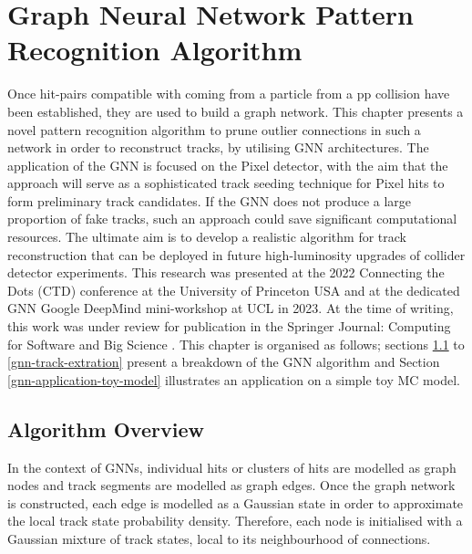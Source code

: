 
\chapter{Graph Neural Network Pattern Recognition Algorithm}\label{chapter-5}

Once hit-pairs compatible with coming from a particle from a pp collision have been established, they are used to build a graph network. This chapter presents a novel pattern recognition algorithm to prune outlier connections in such a network in order to reconstruct tracks, by utilising GNN architectures. The application of the GNN is focused on the Pixel detector, with the aim that the approach will serve as a sophisticated track seeding technique for Pixel hits to form preliminary track candidates. If the GNN does not produce a large proportion of fake tracks, such an approach could save significant computational resources. The ultimate aim is to develop a realistic algorithm for track reconstruction that can be deployed in future high-luminosity upgrades of collider detector experiments. This research was presented at the 2022 Connecting the Dots (CTD) conference at the University of Princeton USA and at the dedicated GNN Google DeepMind mini-workshop at UCL in 2023. At the time of writing, this work was under review for publication in the Springer Journal: Computing for Software and Big Science \cite{Lad_2023_gnn}. This chapter is organised as follows; sections \ref{gnn-algorithm-overview} to \ref{gnn-track-extration} present a breakdown of the GNN algorithm and Section \ref{gnn-application-toy-model} illustrates an application on a simple toy MC model.


\section{Algorithm Overview}
\label{gnn-algorithm-overview}

In the context of GNNs, individual hits or clusters of hits are modelled as graph nodes and track segments are modelled as graph edges. Once the graph network is constructed, each edge is modelled as a Gaussian state in order to approximate the local track state probability density. Therefore, each node is initialised with a Gaussian mixture of track states, local to its neighbourhood of connections.

